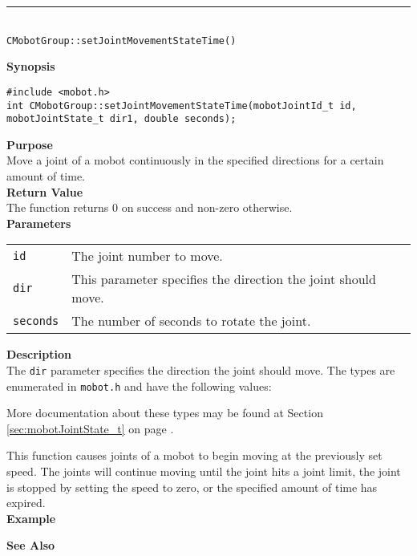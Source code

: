 \noindent
\vspace{5pt}
\rule{4.5in}{0.015in}\\
\noindent
{\LARGE \texttt{CMobotGroup::setJointMovementStateTime()}}\\
{}

\noindent
{\bf Synopsis}
\vspace{-8pt}
\begin{verbatim}
#include <mobot.h>
int CMobotGroup::setJointMovementStateTime(mobotJointId_t id, mobotJointState_t dir1, double seconds);
\end{verbatim}

\noindent
{\bf Purpose}\\
Move a joint of a mobot continuously in the specified directions for a certain amount of time.\\

\noindent
{\bf Return Value}\\
The function returns 0 on success and non-zero otherwise.\\

\noindent
{\bf Parameters}\\
\vspace{-0.1in}
\begin{description}
\item               
\begin{tabular}{p{10 mm}p{145 mm}}
\texttt{id} & The joint number to move. \\
\texttt{dir} & This parameter specifies the direction the joint should move. \\
\texttt{seconds} & The number of seconds to rotate the joint. \\
\end{tabular}
\end{description}

\noindent
{\bf Description}\\
The \texttt{dir} parameter specifies the direction the joint should move.
The types
are enumerated in \texttt{mobot.h} and have the following values:

More documentation about these types may be found at Section
\ref{sec:mobotJointState_t} on page
\pageref{sec:mobotJointState_t}.  

This function causes joints of a mobot to begin moving at the previously set
speed. The joints will continue moving until the joint hits a joint limit, 
the joint is stopped by setting the speed to zero, or the specified amount of
time has expired. \\

\noindent
{\bf Example}\\
\noindent

\noindent
{\bf See Also}\\

